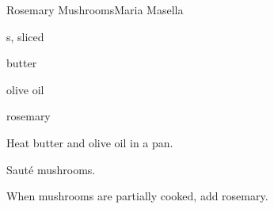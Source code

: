 \begin{recipe}{Rosemary Mushrooms}{Maria Masella}{}

\begin{ingredients}
\item {}s, sliced
\item butter
\item olive oil
\item rosemary
\end{ingredients}

\begin{directions}
\item Heat butter and olive oil in a pan.
\item Sauté mushrooms.
\item When mushrooms are partially cooked, add rosemary.
\end{directions}

\end{recipe}
